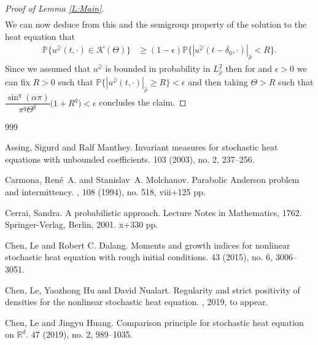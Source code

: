 \documentclass[a4paper,11pt]{article}
\numberwithin{equation}{section}
\theoremstyle{plain}
\theoremstyle{definition}
\newcommand{\R}{\mathbb{R}}
\begin{document}
\begin{proof}[Proof of Lemma \ref{L:Main}]
\begin{align*}
\end{align*} 
We can now deduce from this and the semigroup property of the solution to the heat equation that 
\begin{align*}
\mathbb{P}\{ u^{\hat{\varphi}}(t,\cdot) \in \mathscr K(\Theta) \} & \ge (1-
\epsilon)\mathbb{P}\{ |u^{\hat{\varphi}}(t-\delta_0,\cdot)|_{\hat\rho} < R
\}.
\end{align*}
Since we assumed that $u^{\hat \varphi}$ is bounded in probability in $L^2_{\hat \rho}$ then for and $\epsilon >0$ we can fix $R>0$ such that $\mathbb{P}\{ |u^{\hat{\varphi}}(t,\cdot)|_{\hat\rho} \ge R \} < \epsilon$ and then taking $\Theta > R$ such that $ \dfrac{\sin^q(\alpha \pi)}{\pi^q \Theta^q}\bigg( 1+ R^q \bigg) < \epsilon$ concludes the claim. 
\end{proof}

\begin{small}
\begin{thebibliography}{999}

Assing, Sigurd and Ralf Manthey.
\newblock Invariant measures for stochastic heat equations with unbounded coefficients. 
 103 (2003), no. 2, 237--256.

Carmona, Ren\'e~A.  and Stanislav~A. Molchanov.
\newblock Parabolic Anderson problem and intermittency.
, 108 (1994), no. 518, viii+125 pp. 

Cerrai, Sandra.
\newblock A probabilistic approach. Lecture Notes in Mathematics, 1762. Springer-Verlag, Berlin, 2001. x+330 pp. 

Chen, Le and Robert C. Dalang.
\newblock Moments and growth indices for nonlinear stochastic heat equation
with rough initial conditions.
  43 (2015), no. 6, 3006--3051.

Chen, Le, Yaozhong Hu and David Nualart.
\newblock Regularity and strict positivity of densities for the nonlinear stochastic heat equation.
, 2019, to appear.

Chen, Le and Jingyu Huang.
\newblock Comparison principle for stochastic heat equation on $\R^d$.
  47 (2019), no. 2, 989--1035.


\end{thebibliography}
\end{small}
\end{document}
